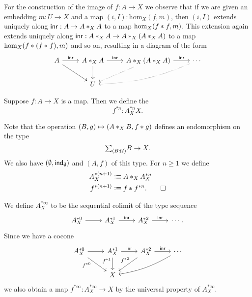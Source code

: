 For the construction of the image of $f:A\to X$ we observe that if we are given an embedding $m:U\to X$ and a map $(i,I):\mathrm{hom}_X(f,m)$, then $(i,I)$ extends uniquely along $\inr:A\to \join[X]{A}{A}$ to a map $\mathrm{hom}_X(\join{f}{f},m)$. This extension again extends uniquely along $\inr:\join[X]{A}{A}\to \join[X]{A}{(\join[X]{A}{A})}$ to a map $\mathrm{hom}_X(\join{f}{(\join{f}{f})},m)$ and so on, resulting in a diagram of the form
\begin{equation*}
\begin{tikzcd}
A \arrow[dr] \arrow[r,"\inr"] & \join[X]{A}{A} \arrow[d,densely dotted] \arrow[r,"\inr"] & \join[X]{A}{(\join[X]{A}{A})} \arrow[dl,densely dotted] \arrow[r,"\inr"] & \cdots \arrow[dll,densely dotted,bend left=10] \\
& U
\end{tikzcd}
\end{equation*}

\begin{defn}
Suppose $f:A\to X$ is a map. Then we define the  
\begin{equation*}
f^{\ast n}:A_X^{\ast n} X.
\end{equation*}
\end{defn}

\begin{constr}
Note that the operation $(B,g)\mapsto (\join[X]{A}{B},\join{f}{g})$ defines an endomorphism on the type
\begin{equation*}
\sm{B:\UU}B\to X.
\end{equation*}
We also have $(\emptyt,\ind{\emptyt})$ and $(A,f)$ of this type. For $n\geq 1$ we define
\begin{align*}
A_X^{\ast (n+1)} & \defeq \join[X]{A}{A_X^{\ast n}} \\
f^{\ast (n+1)} & \defeq \join{f}{f^{\ast n}}.\qedhere
\end{align*}
\end{constr}

\begin{defn}
We define $A_X^{\ast\infty}$ to be the sequential colimit of the type sequence
\begin{equation*}
\begin{tikzcd}
A_X^{\ast 0} \arrow[r] & A_X^{\ast 1} \arrow[r,"\inr"] & A_X^{\ast 2} \arrow[r,"\inr"] & \cdots.
\end{tikzcd}
\end{equation*}
Since we have a cocone
\begin{equation*}
\begin{tikzcd}
A_X^{\ast 0} \arrow[r] \arrow[dr,swap,"f^{\ast 0}" near start] & A_X^{\ast 1} \arrow[r,"\inr"] \arrow[d,swap,"f^{\ast 1}" near start] & A_X^{\ast 2} \arrow[r,"\inr"] \arrow[dl,swap,"f^{\ast 2}" xshift=1ex] & \cdots \arrow[dll,bend left=10] \\
& X
\end{tikzcd}
\end{equation*}
we also obtain a map $f^{\ast\infty}:A_X^{\ast\infty}\to X$ by the universal property of $A_X^{\ast\infty}$. 
\end{defn}

